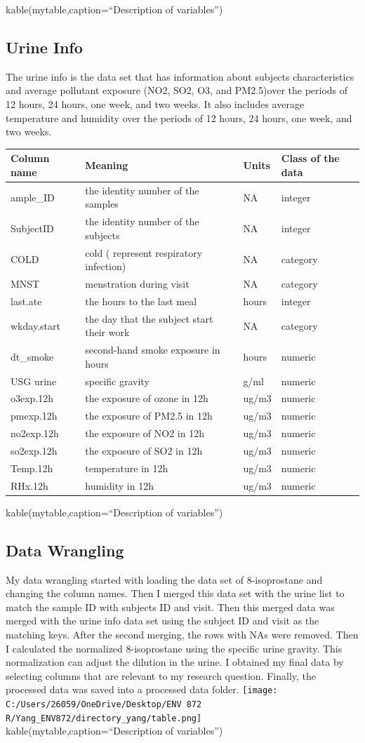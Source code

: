 \documentclass[12pt,]{article}
\begin{document}
kable(mytable,caption=``Description of variables'')

\hypertarget{urine-info}{%
\subsection{Urine Info}\label{urine-info}}

The urine info is the data set that has information about subjects
characteristics and average pollutant exposure (NO2, SO2, O3, and
PM2.5)over the periods of 12 hours, 24 hours, one week, and two weeks.
It also includes average temperature and humidity over the periods of 12
hours, 24 hours, one week, and two weeks.

\begin{longtable}[]{@{}llll@{}}
\toprule
Column name & Meaning & Units & Class of the data\tabularnewline
\midrule
\endhead
ample\_ID & the identity number of the samples & NA &
integer\tabularnewline
SubjectID & the identity number of the subjects & NA &
integer\tabularnewline
COLD & cold ( represent respiratory infection) & NA &
category\tabularnewline
MNST & menstration during visit & NA & category\tabularnewline
last.ate & the hours to the last meal & hours & integer\tabularnewline
wkday.start & the day that the subject start their work & NA &
category\tabularnewline
dt\_smoke & second-hand smoke exposure in hours & hours &
numeric\tabularnewline
USG urine & specific gravity & g/ml & numeric\tabularnewline
o3exp.12h & the exposure of ozone in 12h & ug/m3 &
numeric\tabularnewline
pmexp.12h & the exposure of PM2.5 in 12h & ug/m3 &
numeric\tabularnewline
no2exp.12h & the exposure of NO2 in 12h & ug/m3 & numeric\tabularnewline
so2exp.12h & the exposure of SO2 in 12h & ug/m3 & numeric\tabularnewline
Temp.12h & temperature in 12h & ug/m3 & numeric\tabularnewline
RHx.12h & humidity in 12h & ug/m3 & numeric\tabularnewline
\bottomrule
\end{longtable}

kable(mytable,caption=``Description of variables'')

\hypertarget{data-wrangling}{%
\subsection{Data Wrangling}\label{data-wrangling}}

My data wrangling started with loading the data set of 8-isoprostane and
changing the column names. Then I merged this data set with the urine
list to match the sample ID with subjects ID and visit. Then this merged
data was merged with the urine info data set using the subject ID and
visit as the matching keys. After the second merging, the rows with NAs
were removed. Then I calculated the normalized 8-isoprostane using the
specific urine gravity. This normalization can adjust the dilution in
the urine. I obtained my final data by selecting columns that are
relevant to my research question. Finally, the processed data was saved
into a processed data folder.
\texttt{[image: C:/Users/26059/OneDrive/Desktop/ENV 872 R/Yang\_ENV872/directory\_yang/table.png]}
kable(mytable,caption=``Description of variables'')
\end{document}
